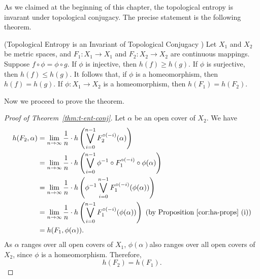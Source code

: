 \documentclass[12pt,twoside,draft]{book}
\begin{document}
As we claimed at the beginning of this chapter, the topological entropy is invarant under topological conjugacy.
The precise statement is the following theorem.
\begin{theorem}
  (Topological Entropy is an Invariant of Topological Conjugacy   )
  Let $X_1$ and $X_2$ be metric spaces, and $F_1: X_1 \to X_1$ and $F_2: X_2 \to X_2$ are continuous mappings.
  Suppose $f\circ \phi = \phi \circ g$.
  If $\phi$ is injective, then $h(f) \geq h(g)$.
  If $\phi$ is surjective, then $h(f) \leq h(g)$.
  It follows that, if $\phi$ is a homeomorphism, then $h(f) = h(g)$.
  If $\phi: X_1 \to X_2$ is a homeomorphism, then $h(F_1) = h(F_2)$.
  \label{thm:t-ent-conj}
\end{theorem}

Now we proceed to prove the theorem.
\begin{proof}[Proof of Theorem~\ref{thm:t-ent-conj}]
  Let $\alpha$ be an open cover of $X_2$.
  We have
  \begin{align*}
    h(F_2, \alpha)
    &= \lim\limits_{n \to \infty} \frac{1}{n} \cdot h \left ( \bigvee\limits_{i = 0}^{n-1} F_2^{\circ (-i)}(\alpha) \right ) \\
    &= \lim\limits_{n \to \infty} \frac{1}{n} \cdot h \left ( \bigvee\limits_{i = 0}^{n-1} \phi^{-1} \circ F_1^{\circ (-i)} \circ \phi (\alpha) \right ) \\
    &= \lim\limits_{n \to \infty} \frac{1}{n} \cdot h \left ( \phi^{-1} \bigvee\limits_{i = 0}^{n-1} F_1^{\circ (-i)} (\phi (\alpha)) \right ) \\
    &= \lim\limits_{n \to \infty} \frac{1}{n} \cdot h \left ( \bigvee\limits_{i = 0}^{n-1} F_1^{\circ (-i)} (\phi (\alpha)) \right ) \mbox{ (by Proposition~\ref{cor:ha-props} (i))} \\
    &= h(F_1, \phi(\alpha)).
  \end{align*}
  As $\alpha$ ranges over all open covers of $X_1$, $\phi(\alpha)$also ranges over all open covers of $X_2$, since $\phi$ is a homeomorphism.
  Therefore,
  \begin{equation*}
    h(F_2) = h(F_1).
  \end{equation*}
\end{proof}
\end{document}
